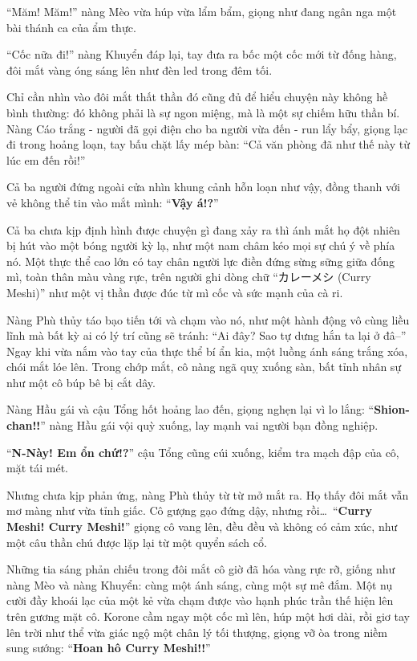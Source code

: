 \documentclass[../main.tex]{subfiles}
\begin{document}
``Măm! Măm!'' nàng Mèo vừa húp vừa lẩm bẩm, giọng như đang ngân nga một bài thánh ca của ẩm thực.

``Cốc nữa đi!'' nàng Khuyển đáp lại, tay đưa ra bốc một cốc mới từ đống hàng, đôi mắt vàng óng sáng lên như đèn led trong đêm tối.

Chỉ cần nhìn vào đôi mắt thất thần đó cũng đủ để hiểu chuyện này không hề bình thường: đó không phải là sự ngon miệng, mà là một sự chiếm hữu thần bí. Nàng Cáo trắng - người đã gọi điện cho ba người vừa đến - run lẩy bẩy, giọng lạc đi trong hoảng loạn, tay bấu chặt lấy mép bàn: ``Cả văn phòng đã như thế này từ lúc em đến rồi!''

Cả ba người đứng ngoài cửa nhìn khung cảnh hỗn loạn như vậy, đồng thanh với vẻ không thể tin vào mắt mình: ``\textbf{Vậy á!?}''

Cả ba chưa kịp định hình được chuyện gì đang xảy ra thì ánh mắt họ đột nhiên bị hút vào một bóng người kỳ lạ, như một nam châm kéo mọi sự chú ý về phía nó. Một thực thể cao lớn có tay chân người lực điền đứng sừng sững giữa đống mì, toàn thân màu vàng rực, trên người ghi dòng chữ ``カレーメシ (Curry Meshi)'' như một vị thần được đúc từ mì cốc và sức mạnh của cà ri.


Nàng Phù thủy táo bạo tiến tới và chạm vào nó, như một hành động vô cùng liều lĩnh mà bất kỳ ai có lý trí cũng sẽ tránh: ``Ai đây? Sao tự dưng hắn ta lại ở đâ--'' Ngay khi vừa nắm vào tay của thực thể bí ẩn kia, một luồng ánh sáng trắng xóa, chói mắt lóe lên. Trong chớp mắt, cô nàng ngã quỵ xuống sàn, bất tỉnh nhân sự như một cô búp bê bị cắt dây.

Nàng Hầu gái và cậu Tổng hốt hoảng lao đến, giọng nghẹn lại vì lo lắng: ``\textbf{Shion-chan!!}'' nàng Hầu gái vội quỳ xuống, lay mạnh vai người bạn đồng nghiệp.

``\textbf{N-Này! Em ổn chứ!?}'' cậu Tổng cũng cúi xuống, kiểm tra mạch đập của cô, mặt tái mét.

Nhưng chưa kịp phản ứng, nàng Phù thủy từ từ mở mắt ra. Họ thấy đôi mắt vẫn mơ màng như vừa tỉnh giấc. Cô gượng gạo đứng dậy, nhưng rồi\dots\ ``\textbf{Curry Meshi! Curry Meshi!}'' giọng cô vang lên, đều đều và không có cảm xúc, như một câu thần chú được lặp lại từ một quyển sách cổ.

Những tia sáng phản chiếu trong đôi mắt cô giờ đã hóa vàng rực rỡ, giống như nàng Mèo và nàng Khuyển: cùng một ánh sáng, cùng một sự mê đắm. Một nụ cười đầy khoái lạc của một kẻ vừa chạm được vào hạnh phúc trần thế hiện lên trên gương mặt cô. Korone cầm ngay một cốc mì lên, húp một hơi dài, rồi giơ tay lên trời như thể vừa giác ngộ một chân lý tối thượng, giọng vỡ òa trong niềm sung sướng: ``\textbf{Hoan hô Curry Meshi!!}''
\end{document}
